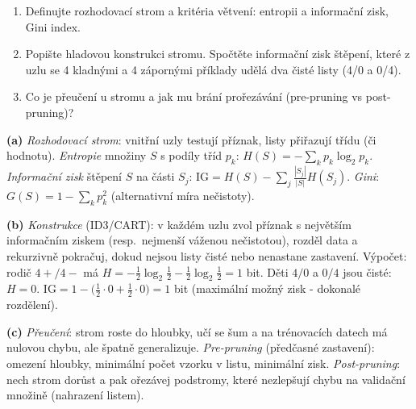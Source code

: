 \begin{zadani}
\begin{enumerate}[label=(\alph*)]
  \item {} Definujte rozhodovací strom a kritéria větvení: entropii a informační zisk, Gini index.
  \item {} Popište hladovou konstrukci stromu. Spočtěte informační zisk štěpení, které z uzlu se 4 kladnými a 4 zápornými příklady udělá dva čisté listy (4/0 a 0/4).
  \item {} Co je přeučení u stromu a jak mu brání prořezávání (pre-pruning vs post-pruning)?
\end{enumerate}
\end{zadani}

\begin{reseni}
\textbf{(a)} \emph{Rozhodovací strom}: vnitřní uzly testují příznak, listy přiřazují třídu (či hodnotu). \emph{Entropie} množiny $S$ s podíly tříd $p_k$: $H(S)=-\sum_k p_k\log_2 p_k$. \emph{Informační zisk} štěpení $S$ na části $S_j$: $\mathrm{IG}=H(S)-\sum_j\frac{|S_j|}{|S|}H(S_j)$. \emph{Gini}: $G(S)=1-\sum_k p_k^2$ (alternativní míra nečistoty).

\textbf{(b)} \emph{Konstrukce} (ID3/CART): v každém uzlu zvol příznak s největším informačním ziskem (resp.\ nejmenší váženou nečistotou), rozděl data a rekurzivně pokračuj, dokud nejsou listy čisté nebo nenastane zastavení. Výpočet: rodič $4{+}/4{-}$ má $H=-\tfrac12\log_2\tfrac12-\tfrac12\log_2\tfrac12=1$ bit. Děti $4/0$ a $0/4$ jsou čisté: $H=0$. $\mathrm{IG}=1-\big(\tfrac12\cdot0+\tfrac12\cdot0\big)=1$ bit (maximální možný zisk - dokonalé rozdělení).

\textbf{(c)} \emph{Přeučení}: strom roste do hloubky, učí se šum a na trénovacích datech má nulovou chybu, ale špatně generalizuje. \emph{Pre-pruning} (předčasné zastavení): omezení hloubky, minimální počet vzorku v listu, minimální zisk. \emph{Post-pruning}: nech strom dorůst a pak ořezávej podstromy, které nezlepšují chybu na validační množině (nahrazení listem).
\end{reseni}

